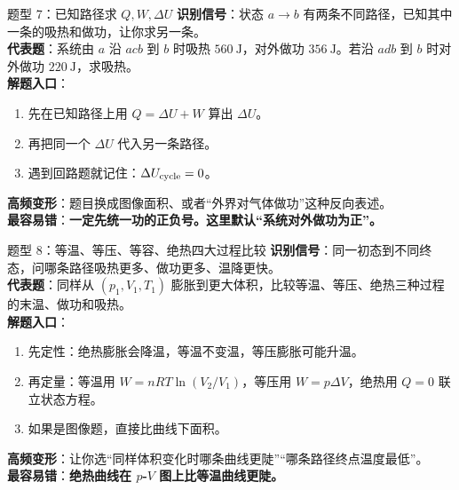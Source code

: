 \documentclass[11pt,a4paper]{ctexart}
\newcommand{\warn}[1]{\textcolor{red!70!black}{\textbf{#1}}}
\begin{document}
\begin{center}
\end{center}

\begin{typebox}{题型 7：已知路径求 \(Q,W,\Delta U\)}
\textbf{识别信号}：状态 \(a\to b\) 有两条不同路径，已知其中一条的吸热和做功，让你求另一条。\\
\textbf{代表题}：系统由 \(a\) 沿 \(acb\) 到 \(b\) 时吸热 \(560\ \mathrm{J}\)，对外做功 \(356\ \mathrm{J}\)。若沿 \(adb\) 到 \(b\) 时对外做功 \(220\ \mathrm{J}\)，求吸热。\\
\textbf{解题入口}：
\begin{enumerate}
  \item 先在已知路径上用 \(Q=\Delta U+W\) 算出 \(\Delta U\)。
  \item 再把同一个 \(\Delta U\) 代入另一条路径。
  \item 遇到回路题就记住：\(\Delta U_{\rm cycle}=0\)。
\end{enumerate}
\textbf{高频变形}：题目换成图像面积、或者“外界对气体做功”这种反向表述。\\
\textbf{最容易错}：\warn{一定先统一功的正负号。这里默认“系统对外做功为正”。}
\end{typebox}

\begin{typebox}{题型 8：等温、等压、等容、绝热四大过程比较}
\textbf{识别信号}：同一初态到不同终态，问哪条路径吸热更多、做功更多、温降更快。\\
\textbf{代表题}：同样从 \((p_1,V_1,T_1)\) 膨胀到更大体积，比较等温、等压、绝热三种过程的末温、做功和吸热。\\
\textbf{解题入口}：
\begin{enumerate}
  \item 先定性：绝热膨胀会降温，等温不变温，等压膨胀可能升温。
  \item 再定量：等温用 \(W=nRT\ln(V_2/V_1)\)，等压用 \(W=p\Delta V\)，绝热用 \(Q=0\) 联立状态方程。
  \item 如果是图像题，直接比曲线下面积。
\end{enumerate}
\textbf{高频变形}：让你选“同样体积变化时哪条曲线更陡”“哪条路径终点温度最低”。\\
\textbf{最容易错}：\warn{绝热曲线在 $p$-$V$ 图上比等温曲线更陡。}
\end{typebox}
\end{document}
